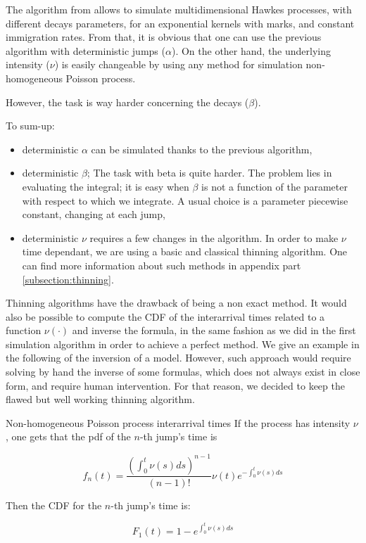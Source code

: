 \documentclass[11pt]{book}
\begin{document}
The algorithm from \cite{my_algo_simul} allows to simulate multidimensional Hawkes processes, with different decays parameters, for an exponential kernels with marks, and constant immigration rates. From that, it is obvious that one can use the previous algorithm with deterministic jumps ($\alpha$). On the other hand, the underlying intensity ($\nu$) is easily changeable by using any method for simulation non-homogeneous Poisson process.

However, the task is way harder concerning the decays ($\beta$).

To sum-up:
\begin{itemize}
\item deterministic $\alpha$ can be simulated thanks to the previous algorithm,
\item deterministic $\beta$; The task with beta is quite harder. The problem lies in evaluating the integral; it is easy when $\beta$ is not a function of the parameter with respect to which we integrate. A usual choice is a parameter piecewise constant, changing at each jump, 
\item deterministic $\nu$ requires a few changes in the algorithm. In order to make $\nu$ time dependant, we are using a basic and classical thinning algorithm. One can find more information about such methods in appendix part \ref{subsection:thinning}.
\end{itemize}





\begin{remarque} 
Thinning algorithms have the drawback of being a non exact method. It would also be possible to compute the CDF of the interarrival times related to a function $\nu( \cdot )$ and inverse the formula, in the same fashion as we did in the first simulation algorithm in order to achieve a perfect method. We give an example in the following of the inversion of a model. However, such approach would require solving by hand the inverse of some formulas, which does not always exist in close form, and require human intervention. For that reason, we decided to keep the flawed but well working thinning algorithm. 
\end{remarque}


\begin{theoreme}{Non-homogeneous Poisson process interarrival times}
If the process has intensity $\nu$, one gets that the pdf of the $n$-th jump's time is 

$$
f_n(t)  = \frac {\left ( \int_0^t \nu(s) ds \right )^{n-1}}{(n-1)!} \nu(t) e^{-  \int_0^t \nu(s) ds }
$$

Then the CDF for the $n$-th jump's time is:

$$
F_1(t) = 1 - e^{  \int_0^t \nu(s) ds } 
$$

\end{theoreme}
\end{document}

